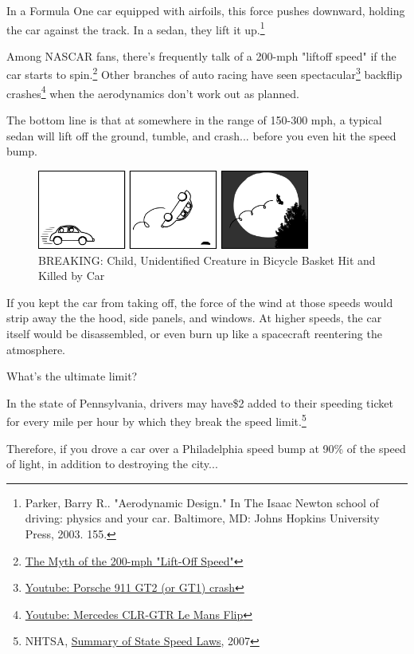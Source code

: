 {{In a Formula One car equipped with airfoils, this force pushes downward, holding the car against the track. In a sedan, they lift it up.{\footnote{Parker, Barry R.. "Aerodynamic Design." In The Isaac Newton school of driving: physics and your car. Baltimore, MD: Johns Hopkins University Press, 2003. 155.} } }

{Among NASCAR fans, there's frequently talk of a 200-mph "liftoff speed" if the car starts to spin.{\footnote{ \href{http://www.buildingspeed.org/blog/2012/06/the-myth-of-the-200-mph-lift-off-speed/}{The Myth of the 200-mph "Lift-Off Speed"}} } Other branches of auto racing have seen spectacular{\footnote{ \href{http://www.youtube.com/watch?v=\_fQGm81x0EY}{Youtube: Porsche 911 GT2 (or GT1) crash}} } backflip crashes{\footnote{ \href{http://www.youtube.com/watch?v=rQbgSe9S54I} {Youtube: Mercedes CLR-GTR Le Mans Flip}} } when the aerodynamics don't work out as planned.}

{The bottom line is that at somewhere in the range of 150-300 mph, a typical sedan will lift off the ground, tumble, and crash... before you even hit the speed bump.}

\begin{figure}[!htbp]
\centering
\includegraphics[scale=0.5, max width=0.8\textwidth]{imgs/a/61/speedbump_flip.png}
\caption{BREAKING: Child, Unidentified Creature in Bicycle Basket Hit and Killed by Car}
\end{figure}

{If you kept the car from taking off, the force of the wind at those speeds would strip away the the hood, side panels, and windows. At higher speeds, the car itself would be disassembled, or even burn up like a spacecraft reentering the atmosphere.}

{What's the ultimate limit?}

{In the state of Pennsylvania, drivers may have\$2 added to their speeding ticket for every mile per hour by which they break the speed limit.{\footnote{NHTSA, \href{http://ntl.bts.gov/lib/30000/30100/30132/810826.pdf}{Summary of State Speed Laws}, 2007} } }

{Therefore, if you drove a car over a Philadelphia speed bump at 90\% of the speed of light, in addition to destroying the city...}

}
